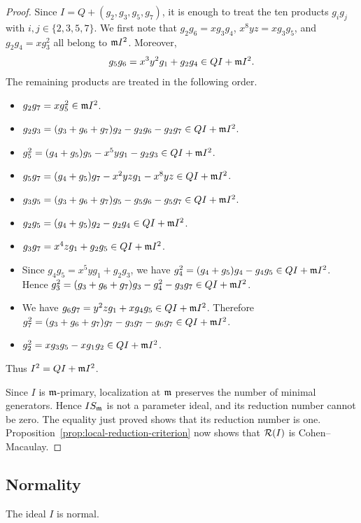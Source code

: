 \begin{proof}
Since $I=Q+(g_2,g_3,g_5,g_7)$, it is enough to treat the ten products
$g_ig_j$ with $i,j\in\{2,3,5,7\}$.  We first note that
$g_2g_6=xg_3g_4$, $x^8yz=xg_3g_5$, and
$g_2g_4=xg_3^2$ all belong to $\mathfrak m I^2$.  Moreover,
$$
 g_5g_6=x^3y^2g_1+g_2g_4\in QI+\mathfrak m I^2.
$$
The remaining products are treated in the following order.
\begin{itemize}
 \item $g_2g_7=xg_5^2\in\mathfrak m I^2$.
 \item
 $g_2g_3=(g_3+g_6+g_7)g_2-g_2g_6-g_2g_7\in QI+\mathfrak m I^2$.
 \item
 $g_5^2=(g_4+g_5)g_5-x^5yg_1-g_2g_3\in QI+\mathfrak m I^2$.
 \item
 $g_5g_7=(g_4+g_5)g_7-x^2yzg_1-x^8yz\in QI+\mathfrak m I^2$.
 \item
 $g_3g_5=(g_3+g_6+g_7)g_5-g_5g_6-g_5g_7
 \in QI+\mathfrak m I^2$.
 \item
 $g_2g_5=(g_4+g_5)g_2-g_2g_4\in QI+\mathfrak m I^2$.
 \item
 $g_3g_7=x^4zg_1+g_2g_5\in QI+\mathfrak m I^2$.
 \item
 Since $g_4g_5=x^5yg_1+g_2g_3$, we have
 $g_4^2=(g_4+g_5)g_4-g_4g_5\in QI+\mathfrak m I^2$.  Hence
 $g_3^2=(g_3+g_6+g_7)g_3-g_4^2-g_3g_7\in QI+\mathfrak m I^2$.
 \item
 We have $g_6g_7=y^2zg_1+xg_4g_5\in QI+\mathfrak m I^2$.  Therefore
 $g_7^2=(g_3+g_6+g_7)g_7-g_3g_7-g_6g_7\in QI+\mathfrak m I^2$.
 \item $g_2^2=xg_3g_5-xg_1g_2\in QI+\mathfrak m I^2$.
\end{itemize}
Thus $I^2=QI+\mathfrak m I^2$.

Since $I$ is $\mathfrak m$-primary, localization at $\mathfrak m$ preserves the number of
minimal generators.  Hence $IS_\mathfrak m$ is not a parameter ideal, and its
reduction number cannot be zero.  The equality just proved shows that its
reduction number is one.  Proposition~\ref{prop:local-reduction-criterion}
now shows that $\mathcal R(I)$ is Cohen--Macaulay.
\end{proof}

\subsection{Normality}

\begin{proposition}
\label{prop:example-normality}
The ideal $I$ is normal.
\end{proposition}

